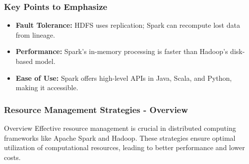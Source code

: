 \documentclass{beamer}
\begin{document}
\begin{frame}[fragile]
    \frametitle{Key Points to Emphasize}
    \begin{itemize}
        \item \textbf{Fault Tolerance:} HDFS uses replication; Spark can recompute lost data from lineage.
        \item \textbf{Performance:} Spark's in-memory processing is faster than Hadoop's disk-based model.
        \item \textbf{Ease of Use:} Spark offers high-level APIs in Java, Scala, and Python, making it accessible.
    \end{itemize}
\end{frame}

\begin{frame}[fragile]
    \frametitle{Resource Management Strategies - Overview}
    \begin{block}{Overview}
        Effective resource management is crucial in distributed computing frameworks like Apache Spark and Hadoop. These strategies ensure optimal utilization of computational resources, leading to better performance and lower costs.
    \end{block}
\end{frame}
\end{document}
